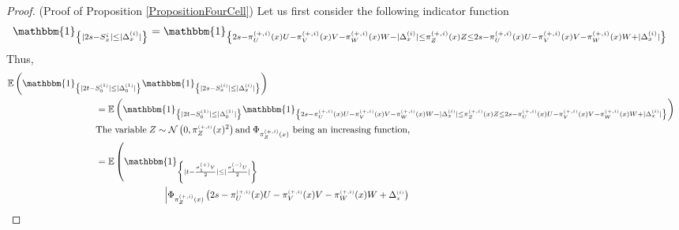 \documentclass[12pt]{article}
\theoremstyle{Theorem}
\begin{document}
\begin{proof}(Proof of Proposition \ref{PropositionFourCell})
Let us first consider the following indicator function
{\small
\begin{align*}
\mathbbm{1}_{\left\{ |2s - S^{i}_{\scriptscriptstyle x}| \leq |\Delta^{\scriptscriptstyle(i)}_ {\scriptscriptstyle x}| \right\}}
& = \mathbbm{1}_{\left\{ 2s -  \pi^{\scriptscriptstyle(+, i)}_{U}(x)U -  \pi^{\scriptscriptstyle(+, i)}_{V}(x) V -  \pi^{\scriptscriptstyle(+, i)}_{W}(x) W  - |\Delta^{\scriptscriptstyle(i)}_ {\scriptscriptstyle x}| \leq \pi^{\scriptscriptstyle(+, i)}_{Z}(x)Z\leq 2s -  \pi^{\scriptscriptstyle(+, i)}_{U}(x)U -  \pi^{\scriptscriptstyle(+, i)}_{V}(x) V -  \pi^{\scriptscriptstyle(+, i)}_{W}(x) W + |\Delta^{\scriptscriptstyle(i)}_ {\scriptscriptstyle x}| \right\}}
\end{align*}}Thus, 
\begin{align*}
\mathbb{E}\left(\mathbbm{1}_{\left\{ |2t - S^{\scriptscriptstyle (1)}_{\scriptscriptstyle 0}| \leq |\Delta^{\scriptscriptstyle (1)}_{\scriptscriptstyle 0}|\right\}}\mathbbm{1}_{\left\{ |2s - S^{\scriptscriptstyle (i)}_{\scriptscriptstyle x}| \leq |\Delta^{\scriptscriptstyle (i)}_ {\scriptscriptstyle x}| \right\}}\right)\\
&\hspace{-6.5cm} = \mathbb{E}\left(\mathbbm{1}_{\left\{ |2t - S^{\scriptscriptstyle (1)}_{\scriptscriptstyle 0}| \leq |\Delta^{\scriptscriptstyle (1)}_{\scriptscriptstyle 0}|\right\}}\mathbbm{1}_{\left\{ 2s -  \pi^{\scriptscriptstyle(+, i)}_{U}(x)U -  \pi^{\scriptscriptstyle(+, i)}_{V}(x) V -  \pi^{\scriptscriptstyle(+, i)}_{W}(x) W  - |\Delta^{\scriptscriptstyle(i)}_ {\scriptscriptstyle x}| \leq \pi^{\scriptscriptstyle(+, i)}_{Z}(x)Z\leq 2s -  \pi^{\scriptscriptstyle(+, i)}_{U}(x)U -  \pi^{\scriptscriptstyle(+, i)}_{V}(x) V -  \pi^{\scriptscriptstyle(+, i)}_{W}(x) W + |\Delta^{\scriptscriptstyle(i)}_ {\scriptscriptstyle x}| \right\}}\right)\\
& \hspace{-6.5cm} \text{The variable}\; Z \sim \mathcal{N}\left(0, \pi^{\scriptscriptstyle(+, i)}_{Z}(x)^{2}\right) \text{and} \; \text{$\Phi_{\pi^{\scriptscriptstyle(+, i)}_{Z}(x)}$ being an increasing function,}\\
& \hspace{-6.5cm} = \mathbb{E}\left(\mathbbm{1}_{\left\{ |t - \frac{\sigma^{\scriptscriptstyle (+)}_{1}V}{2}| \leq |\frac{\sigma^{\scriptscriptstyle (-)}_{1}U}{2}|\right\}}\right. \\
&\hspace{-4cm} \left. \left|\Phi_{ \pi^{\scriptscriptstyle(+, i)}_{Z}(x)}\left( 2s -  \pi^{\scriptscriptstyle(+, i)}_{U}(x)U -  \pi^{\scriptscriptstyle(+, i)}_{V}(x) V -  \pi^{\scriptscriptstyle(+, i)}_{W}(x) W  + \Delta^{\scriptscriptstyle(i)}_ {\scriptscriptstyle x}  \right) \right. \right.  \nonumber \\

\end{align*}
\end{proof}
\end{document}
